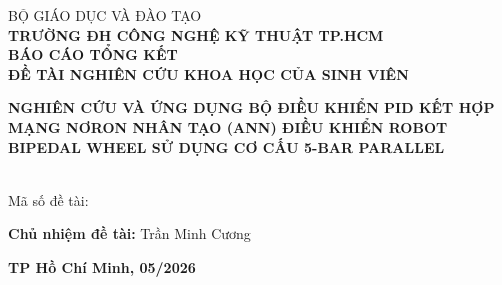 \documentclass[13pt]{extreport}
\begin{document}
\begin{titlepage}
    \thispagestyle{empty}

    \centering
    \vspace*{0.4cm}


    {\fontsize{13pt}{15pt}\selectfont BỘ GIÁO DỤC VÀ ĐÀO TẠO}\\[0.1cm]
    {\fontsize{14pt}{16pt}\selectfont\bfseries TRƯỜNG ĐH CÔNG NGHỆ KỸ THUẬT TP.HCM}\\[2.8cm]

    {\fontsize{16pt}{20pt}\selectfont\bfseries BÁO CÁO TỔNG KẾT}\\[0.4cm]
    {\fontsize{14pt}{17pt}\selectfont\bfseries ĐỀ TÀI NGHIÊN CỨU KHOA HỌC CỦA SINH VIÊN}\\[2.4cm]

    \parbox{12cm}{\centering\fontsize{14pt}{18pt}\selectfont\bfseries
    NGHIÊN CỨU VÀ ỨNG DỤNG BỘ ĐIỀU KHIỂN PID
    KẾT HỢP MẠNG NƠRON NHÂN TẠO (ANN)
    ĐIỀU KHIỂN ROBOT BIPEDAL WHEEL
    SỬ DỤNG CƠ CẤU 5-BAR PARALLEL
    }
    \\[0.8cm]

    {\fontsize{13pt}{15pt}\selectfont Mã số đề tài: \underline{\hspace{5cm}}}\\[2.8cm]

    \begin{center}
    {\fontsize{13pt}{15pt}\selectfont\bfseries Chủ nhiệm đề tài:\quad}%
    {\fontsize{13pt}{15pt}\selectfont Trần Minh Cương}
    \end{center}

    \vfill

    {\fontsize{13pt}{15pt}\selectfont\bfseries TP Hồ Chí Minh, 05/2026}
\end{titlepage}
\end{document}
